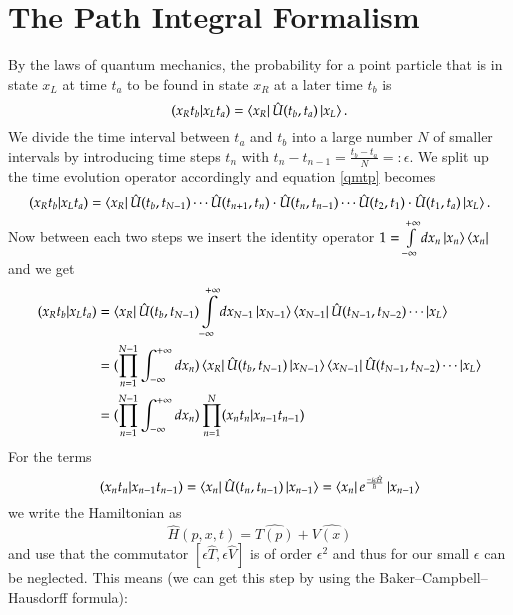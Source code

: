 \section{The Path Integral Formalism}

By the laws of quantum mechanics, the probability for a point particle that is in state $x_L$ at time $t_a$ to be found in state $x_R$ at a later time $t_b$ is
\begin{equation} \label{qmtp}
  (x_R t_b | x_L t_a) = \bra{x_R}\hat{U}(t_b,t_a)\ket{x_L}.
\end{equation}
We divide the time interval between $t_a$ and $t_b$ into a large number $N$ of smaller intervals by introducing time steps $t_n$ with $t_n -t_{n-1} = \frac{t_b - t_a}{N} =:\epsilon$. We split up the time evolution operator accordingly and equation \ref{qmtp} becomes
\begin{equation} \label{qmtpn}
  (x_R t_b | x_L t_a) = \bra{x_R}\hat{U}(t_b,t_{N-1}) \cdots \hat{U}(t_{n+1},t_n)\cdot\hat{U}(t_n,t_{n-1}) \cdots \hat{U}(t_2,t_1)\cdot\hat{U}(t_1,t_a)\ket{x_L}.
\end{equation}
Now between each two steps we insert the identity operator $1 = \int\limits_{-\infty}^{+\infty} dx_n \ket{x_n}\bra{x_n}$ and we get 
\begin{align} \label{tpi}
  (x_R t_b | x_L t_a) &=  \bra{x_R}\hat{U}(t_b,t_{N-1}) \int\limits_{-\infty}^{+\infty} dx_{N-1} \ket{x_{N-1}}\bra{x_{N-1}} \hat{U}(t_{N-1},t_{N-2}) \cdots \ket{x_L} \\
                      &=  (\prod_{n=1}^{N-1} \int_{-\infty}^{+\infty} dx_{n}) \bra{x_R}\hat{U}(t_b,t_{N-1})  \ket{x_{N-1}}\bra{x_{N-1}} \hat{U}(t_{N-1},t_{N-2}) \cdots \ket{x_L} \\
                      &=  (\prod_{n=1}^{N-1} \int_{-\infty}^{+\infty} dx_{n})\prod_{n=1}^{N} (x_n t_n | x_{n-1} t_{n-1})
\end{align}
For the terms 
\begin{equation}\label{tpn}
  (x_n t_n | x_{n-1} t_{n-1}) = \bra{x_n} \hat{U}(t_{n},t_{n-1}) \ket{x_{n-1}} = \bra{x_n} e^{\frac{-i \epsilon \hat{H}}{\hbar}} \ket{x_{n-1}} 
\end{equation}
we write the Hamiltonian as
\begin{equation}\label{HTV}
  \hat{H}(p,x,t) = \hat{T(p)} + \hat{V(x)}
\end{equation}
and use that the commutator $[\epsilon \hat{T}, \epsilon \hat{V}]$ is of order $\epsilon^2$ and thus for our small $\epsilon$ can be neglected. This means (we can get this step by using the Baker–Campbell–Hausdorff formula):
